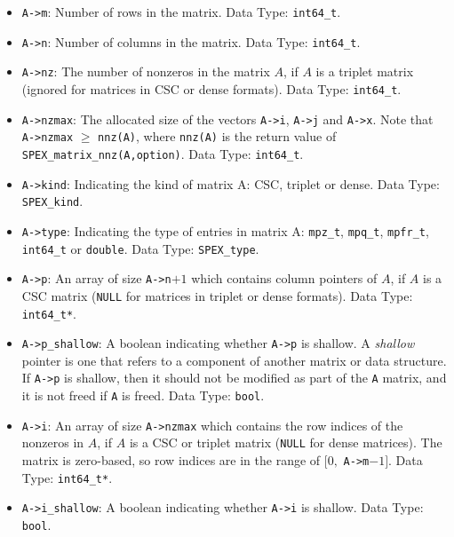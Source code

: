 \documentclass[12pt]{report}
\theoremstyle{definition}
\begin{document}
\begin{itemize}
\item \verb|A->m|: Number of rows in the matrix. Data Type: \verb|int64_t|.

\item \verb|A->n|: Number of columns in the matrix. Data Type: \verb|int64_t|.

\item \verb|A->nz|: The number of nonzeros in the matrix $A$, if $A$ is
a triplet matrix (ignored for matrices in CSC or dense formats). Data Type:
\verb|int64_t|.

\item \verb|A->nzmax|: The allocated size of the vectors \verb|A->i|,
\verb|A->j| and \verb|A->x|. Note that \verb|A->nzmax| $\geq$ \verb|nnz(A)|,
where \verb|nnz(A)| is the return value of \verb|SPEX_matrix_nnz(A,option)|.
Data Type: \verb|int64_t|.

\item \verb|A->kind|: Indicating the kind of matrix A: CSC, triplet or dense.
Data Type: \verb|SPEX_kind|.

\item \verb|A->type|: Indicating the type of entries in matrix A: \verb|mpz_t|,
\verb|mpq_t|, \verb|mpfr_t|, \verb|int64_t| or \verb|double|.
Data Type: \verb|SPEX_type|.

\item \verb|A->p|: An array of size \verb|A->n|$+1$ which contains column pointers
of $A$, if $A$ is a CSC matrix (\verb|NULL| for matrices in triplet or dense
formats). Data Type: \verb|int64_t*|.

\item \verb|A->p_shallow|: A boolean indicating whether \verb|A->p| is shallow.
A {\em shallow} pointer is one that refers to a component of another matrix or
data structure.  If \verb|A->p| is shallow, then it should not be modified
as part of the \verb|A| matrix, and it is not freed if \verb|A| is freed.
Data Type: \verb|bool|.

\item \verb|A->i|: An array of size \verb|A->nzmax| which contains the row
indices of the nonzeros in $A$, if $A$ is a CSC or triplet matrix (\verb|NULL|
for dense matrices). The matrix is zero-based, so row indices are
in the range of $[0,$ \verb|A->m|$-1]$. Data Type: \verb|int64_t*|.

\item \verb|A->i_shallow|: A boolean indicating whether \verb|A->i| is shallow.
Data Type: \verb|bool|.


\end{itemize}
\end{document}

